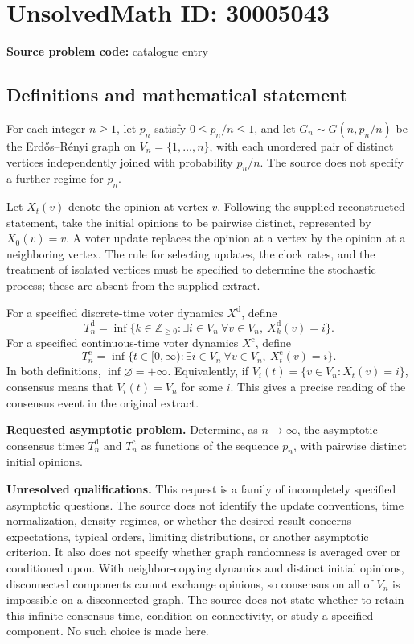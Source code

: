 \documentclass[11pt]{article}
\newcommand{\Z}{\mathbb{Z}}
\begin{document}
\section*{UnsolvedMath ID: 30005043}
\textbf{Source problem code:} catalogue entry
\subsection{Definitions and mathematical statement}
For each integer \(n\geq 1\), let \(p_n\) satisfy \(0\leq p_n/n\leq 1\), and let \(G_n\sim G(n,p_n/n)\) be the Erd\H{o}s--R\'enyi graph on \(V_n=\{1,\ldots,n\}\), with each unordered pair of distinct vertices independently joined with probability \(p_n/n\). The source does not specify a further regime for \(p_n\).

Let \(X_t(v)\) denote the opinion at vertex \(v\). Following the supplied reconstructed statement, take the initial opinions to be pairwise distinct, represented by \(X_0(v)=v\). A voter update replaces the opinion at a vertex by the opinion at a neighboring vertex. The rule for selecting updates, the clock rates, and the treatment of isolated vertices must be specified to determine the stochastic process; these are absent from the supplied extract.

For a specified discrete-time voter dynamics \(X^{\mathrm d}\), define
\[
T_n^{\mathrm d}=\inf\bigl\{k\in\Z_{\geq0}:\exists i\in V_n\ \forall v\in V_n,\ X_k^{\mathrm d}(v)=i\bigr\}.
\]
For a specified continuous-time voter dynamics \(X^{\mathrm c}\), define
\[
T_n^{\mathrm c}=\inf\bigl\{t\in[0,\infty):\exists i\in V_n\ \forall v\in V_n,\ X_t^{\mathrm c}(v)=i\bigr\}.
\]
In both definitions, \(\inf\varnothing=+\infty\). Equivalently, if \(V_i(t)=\{v\in V_n:X_t(v)=i\}\), consensus means that \(V_i(t)=V_n\) for some \(i\). This gives a precise reading of the consensus event in the original extract.

\textbf{Requested asymptotic problem.} Determine, as \(n\to\infty\), the asymptotic consensus times \(T_n^{\mathrm d}\) and \(T_n^{\mathrm c}\) as functions of the sequence \(p_n\), with pairwise distinct initial opinions.

\textbf{Unresolved qualifications.} This request is a family of incompletely specified asymptotic questions. The source does not identify the update conventions, time normalization, density regimes, or whether the desired result concerns expectations, typical orders, limiting distributions, or another asymptotic criterion. It also does not specify whether graph randomness is averaged over or conditioned upon. With neighbor-copying dynamics and distinct initial opinions, disconnected components cannot exchange opinions, so consensus on all of \(V_n\) is impossible on a disconnected graph. The source does not state whether to retain this infinite consensus time, condition on connectivity, or study a specified component. No such choice is made here.
\end{document}
